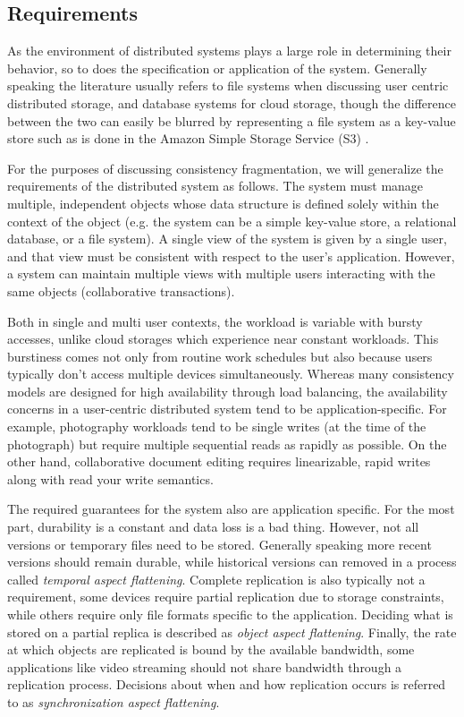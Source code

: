 \documentclass[letterpaper,twocolumn,10pt]{article}
\begin{document}
\subsection{Requirements}

As the environment of distributed systems plays a large role in determining their behavior, so to does the specification or application of the system. Generally speaking the literature usually refers to file systems when discussing user centric distributed storage, and database systems for cloud storage, though the difference between the two can easily be blurred by representing a file system as a key-value store such as is done in the Amazon Simple Storage Service (S3) \cite{bermbach_eventual_2011}.

For the purposes of discussing consistency fragmentation, we will generalize the requirements of the distributed system as follows. The system must manage multiple, independent objects whose data structure is defined solely within the context of the object (e.g. the system can be a simple key-value store, a relational database, or a file system). A single view of the system is given by a single user, and that view must be consistent with respect to the user's application. However, a system can maintain multiple views with multiple users interacting with the same objects (collaborative transactions).

Both in single and multi user contexts, the workload is variable with bursty accesses, unlike cloud storages which experience near constant workloads. This burstiness comes not only from routine work schedules but also because users typically don't access multiple devices simultaneously. Whereas many consistency models are designed for high availability through load balancing, the availability concerns in a user-centric distributed system tend to be application-specific. For example, photography workloads tend to be single writes (at the time of the photograph) but require multiple sequential reads as rapidly as possible. On the other hand, collaborative document editing requires linearizable, rapid writes along with read your write semantics.

The required guarantees for the system also are application specific. For the most part, durability is a constant and data loss is a bad thing. However, not all versions or temporary files need to be stored. Generally speaking more recent versions should remain durable, while historical versions can removed in a process called \textit{temporal aspect flattening}. Complete replication is also typically not a requirement, some devices require partial replication due to storage constraints, while others require only file formats specific to the application. Deciding what is stored on a partial replica is described as \textit{object aspect flattening}.  Finally, the rate at which objects are replicated is bound by the available bandwidth, some applications like video streaming should not share bandwidth through a replication process. Decisions about when and how replication occurs is referred to as \textit{synchronization aspect flattening}.
\end{document}
